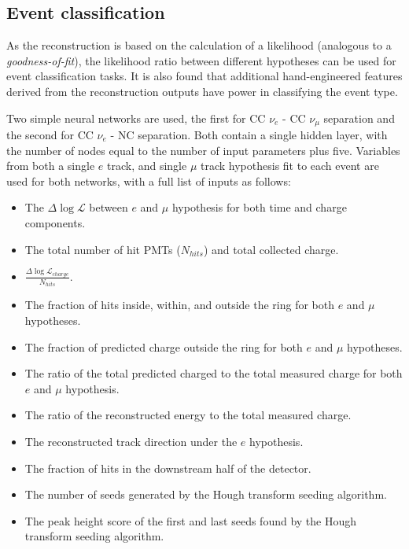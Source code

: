 \subsection{Event classification}%
\label{sec:cnn_old_pid} %

As the reconstruction is based on the calculation of a likelihood (analogous to a
\emph{goodness-of-fit}), the likelihood ratio between different hypotheses can be used for event
classification tasks. It is also found that additional hand-engineered features derived from the
reconstruction outputs have power in classifying the event type.

Two simple neural networks are used, the first for CC $\nu_{e}$ - CC $\nu_{\mu}$ separation and
the second for CC $\nu_{e}$ - NC separation. Both contain a single hidden layer, with the number
of nodes equal to the number of input parameters plus five. Variables from both a single $e$
track, and single $\mu$ track hypothesis fit to each event are used for both networks, with a full
list of inputs as follows:
\begin{itemize}
    \item The $\Delta\log\mathcal{L}$ between $e$ and $\mu$ hypothesis for both time and charge
          components.
    \item The total number of hit PMTs ($N_{hits}$) and total collected charge.
    \item $\frac{\Delta\log\mathcal{L}_{charge}}{N_{hits}}$.
    \item The fraction of hits inside, within, and outside the ring for both $e$ and $\mu$
          hypotheses.
    \item The fraction of predicted charge outside the ring for both $e$ and $\mu$ hypotheses.
    \item The ratio of the total predicted charged to the total measured charge for both $e$
          and $\mu$ hypothesis.
    \item The ratio of the reconstructed energy to the total measured charge.
    \item The reconstructed track direction under the $e$ hypothesis.
    \item The fraction of hits in the downstream half of the detector.
    \item The number of seeds generated by the Hough transform seeding algorithm.
    \item The peak height score of the first and last seeds found by the Hough transform seeding
          algorithm.
\end{itemize}


